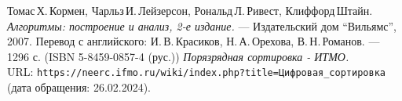 \begin{thebibliography}{99}
    Томас\,Х.\,Кормен, Чарльз\,И.\,Лейзерсон, Рональд\,Л.\,Ривест, Клиффорд\,Штайн.
    {\itshape Алгоритмы: построение и анализ, 2-е издание.} --- Издательский дом \enquote{Вильямс}, 2007. Перевод с английского: И.\,В.\,Красиков, Н.\,А.\,Орехова, В.\,Н.\,Романов. --- 1296 с. (ISBN 5-8459-0857-4 (рус.))
    {\itshape Порязрядная сортировка - ИТМО.} \\URL: \texttt{https://neerc.ifmo.ru/wiki/index.php?title=Цифровая\_сортировка} (дата обращения: 26.02.2024).
    \end{thebibliography}
    \pagebreak
    
    
    
